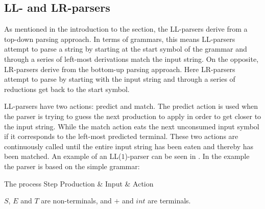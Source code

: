 \subsection{LL- and LR-parsers}
\label{subsec:llparsersandlrparsers}
As mentioned in the introduction to the section, the LL-parsers derive from a 
top-down parsing approach. In terms of grammars, this means LL-parsers
attempt to parse a string by starting at the start symbol of the grammar and
through a series of left-most derivations match the input string. On the
opposite, LR-parsers derive from the bottom-up parsing approach. Here 
LR-parsers attempt to parse by starting with the input string and through a
series of reductions get back to the start symbol.

LL-parsers have two actions: predict and match. The predict action is
used when the parser is trying to guess the next production to apply in
order to get closer to the input string. While the match action eats
the next unconsumed input symbol if it corresponds to the left-most
predicted terminal. These two actions are continuously called until the
entire input string has been eaten and thereby has been matched. An
example of an LL($1$)-parser can be seen in . In the
example the parser is based on the simple grammar:

\begin{centering}
\begin{ebnf}
\end{ebnf}
\end{centering}

	      {The process                                          }
{Step  	 }{Production & Input       & Action                        }{
}

$S$, $E$ and $T$ are non-terminals, and $+$ and $int$ are terminals. 

